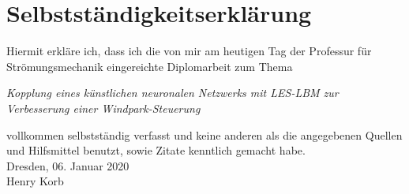 \cleardoublepage
\chapter*{Selbstständigkeitserklärung}
\thispagestyle{empty}
Hiermit erkläre ich, dass ich die von mir am heutigen Tag der Professur für Strömungsmechanik eingereichte 
Diplomarbeit
zum Thema 
\begin{center}
\textit{Kopplung eines künstlichen neuronalen Netzwerks mit LES-LBM zur Verbesserung einer Windpark-Steuerung}
\end{center}
vollkommen selbstständig verfasst und keine anderen als die angegebenen Quellen und Hilfsmittel benutzt, sowie Zitate kenntlich gemacht habe.
\\[10mm]
Dresden, 06. Januar 2020 \\[1cm]
Henry Korb
